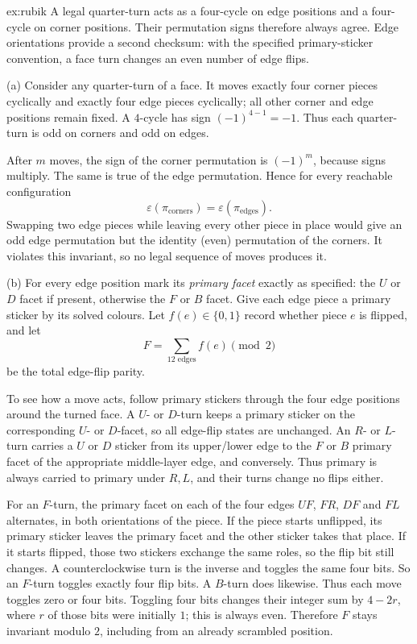 \begin{solution}{ex:rubik}
\idea A legal quarter-turn acts as a four-cycle on edge positions and a four-cycle on corner positions. Their permutation signs therefore always agree. Edge orientations provide a second checksum: with the specified primary-sticker convention, a face turn changes an even number of edge flips.

\writeup (a) Consider any quarter-turn of a face. It moves exactly four corner pieces cyclically and exactly four edge pieces cyclically; all other corner and edge positions remain fixed. A $4$-cycle has sign $(-1)^{4-1}=-1$. Thus each quarter-turn is odd on corners and odd on edges.

After $m$ moves, the sign of the corner permutation is $(-1)^m$, because signs multiply. The same is true of the edge permutation. Hence for every reachable configuration
\[
\varepsilon(\pi_{\mathrm{corners}})
=\varepsilon(\pi_{\mathrm{edges}}).
\]
Swapping two edge pieces while leaving every other piece in place would give an odd edge permutation but the identity (even) permutation of the corners. It violates this invariant, so no legal sequence of moves produces it.

(b) For every edge position mark its \emph{primary facet} exactly as specified: the $U$ or $D$ facet if present, otherwise the $F$ or $B$ facet. Give each edge piece a primary sticker by its solved colours. Let $f(e)\in\{0,1\}$ record whether piece $e$ is flipped, and let
\[
F=\sum_{\text{12 edges}}f(e)\pmod2
\]
be the total edge-flip parity.

To see how a move acts, follow primary stickers through the four edge positions around the turned face. A $U$- or $D$-turn keeps a primary sticker on the corresponding $U$- or $D$-facet, so all edge-flip states are unchanged. An $R$- or $L$-turn carries a $U$ or $D$ sticker from its upper/lower edge to the $F$ or $B$ primary facet of the appropriate middle-layer edge, and conversely. Thus primary is always carried to primary under $R,L$, and their turns change no flips either.

For an $F$-turn, the primary facet on each of the four edges $UF$, $FR$, $DF$ and $FL$ alternates, in both orientations of the piece. If the piece starts unflipped, its primary sticker leaves the primary facet and the other sticker takes that place. If it starts flipped, those two stickers exchange the same roles, so the flip bit still changes. A counterclockwise turn is the inverse and toggles the same four bits. So an $F$-turn toggles exactly four flip bits. A $B$-turn does likewise. Thus each move toggles zero or four bits. Toggling four bits changes their integer sum by $4-2r$, where $r$ of those bits were initially $1$; this is always even. Therefore $F$ stays invariant modulo $2$, including from an already scrambled position.


\end{solution}
